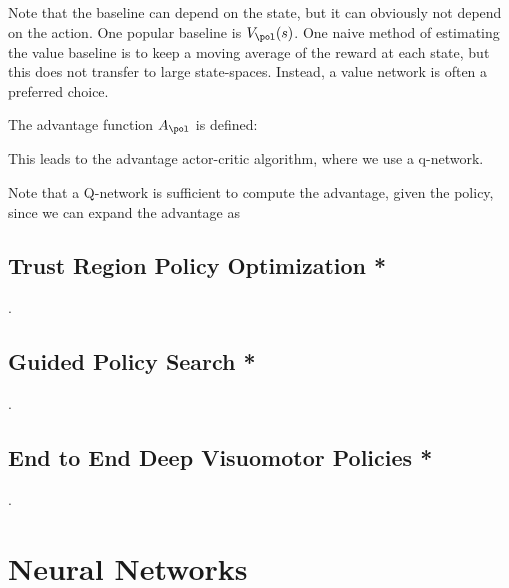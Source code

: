 \documentclass[12pt]{article}
\begin{document}

Note that the baseline can depend on the state, but it can obviously not depend on the action. One popular baseline is $V_{\pol}(s)$. One naive method of estimating the value baseline is to keep a moving average of the reward at each state, but this does not transfer to large state-spaces. Instead, a value network is often a preferred choice.

The advantage function $A_{\pol}$ is defined:


This leads to the advantage actor-critic algorithm, where we use a q-network.


Note that a Q-network is sufficient to compute the advantage, given the policy, since we can expand the advantage as


\subsection{Trust Region Policy Optimization *}
.
\subsection{Guided Policy Search *}
.
\subsection{End to End Deep Visuomotor Policies *}
.
\section{Neural Networks}
\end{document}
